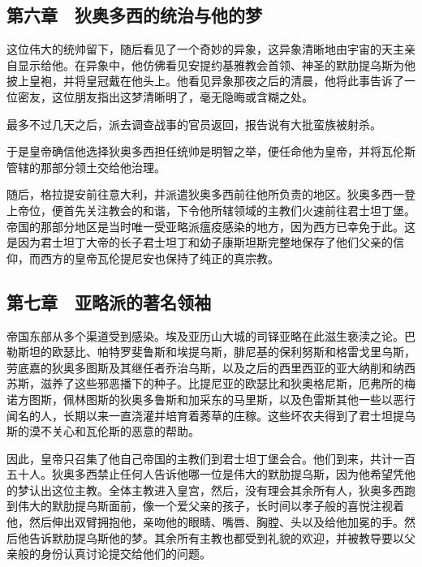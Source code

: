 
\subsection{第六章　狄奥多西的统治与他的梦}

这位伟大的统帅留下，随后看见了一个奇妙的异象，这异象清晰地由宇宙的天主亲自显示给他。在异象中，他仿佛看见安提约基雅教会首领、神圣的默肋提乌斯为他披上皇袍，并将皇冠戴在他头上。他看见异象那夜之后的清晨，他将此事告诉了一位密友，这位朋友指出这梦清晰明了，毫无隐晦或含糊之处。\par

最多不过几天之后，派去调查战事的官员返回，报告说有大批蛮族被射杀。\par

于是皇帝确信他选择狄奥多西担任统帅是明智之举，便任命他为皇帝，并将瓦伦斯管辖的那部分领土交给他治理。\par

随后，格拉提安前往意大利，并派遣狄奥多西前往他所负责的地区。狄奥多西一登上帝位，便首先关注教会的和谐，下令他所辖领域的主教们火速前往君士坦丁堡。帝国的那部分地区是当时唯一受亚略派瘟疫感染的地方，因为西方已幸免于此。这是因为君士坦丁大帝的长子君士坦丁和幼子康斯坦斯完整地保存了他们父亲的信仰，而西方的皇帝瓦伦提尼安也保持了纯正的真宗教。\par


\subsection{第七章　亚略派的著名领袖}

帝国东部从多个渠道受到感染。埃及亚历山大城的司铎亚略在此滋生亵渎之论。巴勒斯坦的欧瑟比、帕特罗斐鲁斯和埃提乌斯，腓尼基的保利努斯和格雷戈里乌斯，劳底嘉的狄奥多图斯及其继任者乔治乌斯，以及之后的西里西亚的亚大纳削和纳西苏斯，滋养了这些邪恶播下的种子。比提尼亚的欧瑟比和狄奥格尼斯，厄弗所的梅诺方图斯，佩林图斯的狄奥多鲁斯和加采东的马里斯，以及色雷斯其他一些以恶行闻名的人，长期以来一直浇灌并培育着莠草的庄稼。这些坏农夫得到了君士坦提乌斯的漠不关心和瓦伦斯的恶意的帮助。\par

因此，皇帝只召集了他自己帝国的主教们到君士坦丁堡会合。他们到来，共计一百五十人。狄奥多西禁止任何人告诉他哪一位是伟大的默肋提乌斯，因为他希望凭他的梦认出这位主教。全体主教进入皇宫，然后，没有理会其余所有人，狄奥多西跑到伟大的默肋提乌斯面前，像一个爱父亲的孩子，长时间以孝子般的喜悦注视着他，然后伸出双臂拥抱他，亲吻他的眼睛、嘴唇、胸膛、头以及给他加冕的手。然后他告诉默肋提乌斯他的梦。其余所有主教也都受到礼貌的欢迎，并被教导要以父亲般的身份认真讨论提交给他们的问题。\par

